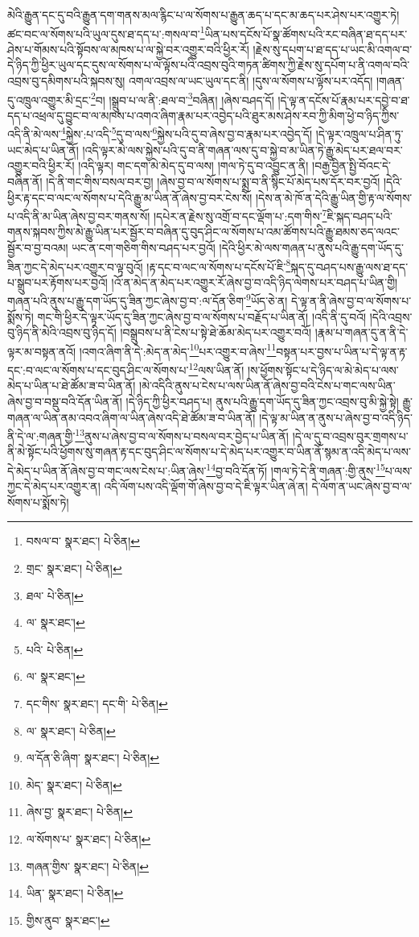 མེའི་རྒྱུན་དང་དུ་བའི་རྒྱུན་དག་གནས་མལ་རྙིང་པ་ལ་སོགས་པ་རྒྱུན་ཆད་པ་དང་མ་ཆད་པར་ཤེས་པར་འགྱུར་ཏེ། ཚང་བང་ལ་སོགས་པའི་ཡུལ་དུས་ཐ་དད་པ་:གསལ་བ་\footnote{བསལ་བ་  སྣར་ཐང་།  པེ་ཅིན། }ཡིན་པས་དངོས་པོ་སྣ་ཚོགས་པའི་རང་བཞིན་ཐ་དད་པར་ཤེས་པ་གོམས་པའི་སྟོབས་ལ་མཁས་པ་ལ་སྐྱེ་བར་འགྱུར་བའི་ཕྱིར་རོ། །རྗེས་སུ་དཔག་པ་ཐ་དད་པ་ཡང་མི་འགལ་བ་དེ་ཉིད་ཀྱི་ཕྱིར་ཡུལ་དང་དུས་ལ་སོགས་པ་ལ་ལྟོས་པའི་འབྲས་བུའི་གཏན་ཚིགས་ཀྱི་རྗེས་སུ་དཔོག་པ་ནི་འགལ་བའི་འབྲས་བུ་དམིགས་པའི་སྐབས་སུ། འགལ་འབྲས་ལ་ཡང་ཡུལ་དང་ནི། །དུས་ལ་སོགས་པ་ལྟོས་པར་འདོད། །གཞན་དུ་འཁྲུལ་འགྱུར་མི་དྲང་\footnote{གྲང་  སྣར་ཐང་།  པེ་ཅིན། }བ། །སྒྲུབ་པ་ལ་ནི་:ཐལ་བ་\footnote{ཐལ་  པེ་ཅིན། }བཞིན། །ཞེས་བཤད་དོ། །དེ་ལྟ་ན་དངོས་པོ་རྣམ་པར་དབྱེ་བ་ཐ་དད་པ་འཕྲལ་དུ་བྱུང་བ་ལ་མཁས་པ་འགའ་ཞིག་རྣམ་པར་འབྱེད་པའི་ཐུར་མས་ཤེས་རབ་ཀྱི་མིག་ཕྱེ་བ་ཉིད་ཀྱིས་འདི་ནི་མེ་ལས་\footnote{ལ་  སྣར་ཐང་། }སྐྱེས་:པ་འདི་\footnote{པའི་  པེ་ཅིན། }དུ་བ་ལས་\footnote{ལ་  སྣར་ཐང་། }སྐྱེས་པའི་དུ་བ་ཞེས་བྱ་བ་རྣམ་པར་འབྱེད་དོ། །དེ་ལྟར་འཁྲུལ་པ་ཤིན་ཏུ་ཡང་མེད་པ་ཡིན་ནོ། །འདི་ལྟར་མེ་ལས་སྐྱེས་པའི་དུ་བ་ནི་གཞན་ལས་དུ་བ་སྐྱེ་བ་མ་ཡིན་ཏེ་རྒྱུ་མེད་པར་ཐལ་བར་འགྱུར་བའི་ཕྱིར་རོ། །འདི་ལྟར། གང་དག་མེ་མེད་དུ་བ་ལས། །གལ་ཏེ་དུ་བ་འབྱུང་ན་ནི། །བརྒྱ་བྱིན་སྤྱི་བོའང་དེ་བཞིན་ནོ། །དེ་ནི་གང་གིས་བསལ་བར་བྱ། །ཞེས་བྱ་བ་ལ་སོགས་པ་སྨྲ་བ་ནི་སྙིང་པོ་མེད་པས་དོར་བར་བྱའོ། །དེའི་ཕྱིར་རྟ་དང་བ་ལང་ལ་སོགས་པ་དེའི་རྒྱུ་མ་ཡིན་ནོ་ཞེས་བྱ་བར་ངེས་སོ། །དེས་ན་མེ་ཁོ་ན་དེའི་རྒྱུ་ཡིན་གྱི་རྟ་ལ་སོགས་པ་འདི་ནི་མ་ཡིན་ཞེས་བྱ་བར་གནས་སོ། །དཔེར་ན་རྗེས་སུ་འགྲོ་བ་དང་ལྡོག་པ་:དག་གིས་\footnote{དང་གིས་  སྣར་ཐང་། དང་གི་  པེ་ཅིན། }ཇི་སྐད་བཤད་པའི་གནས་སྐབས་ཀྱིས་མེ་རྒྱུ་ཡིན་པར་སྦྱོར་བ་བཞིན་དུ་བུད་ཤིང་ལ་སོགས་པ་འམ་ཚོགས་པའི་རྒྱུ་ཐམས་ཅད་ལའང་སྦྱོར་བ་བྱ་བའམ། ཡང་ན་ངག་གཅིག་གིས་བཤད་པར་བྱའོ། །དེའི་ཕྱིར་མེ་ལས་གཞན་པ་ནུས་པའི་རྒྱུ་དག་ཡོད་དུ་ཟིན་ཀྱང་དེ་མེད་པར་འགྱུར་བ་ལྟ་བུའོ། །རྟ་དང་བ་ལང་ལ་སོགས་པ་དངོས་པོ་ཇི་\footnote{ལ་  སྣར་ཐང་།  པེ་ཅིན། }སྐད་དུ་བཤད་པས་རྒྱུ་ལས་ཐ་དད་པ་སྒྲུབ་པར་རྟོགས་པར་བྱའོ། །འོ་ན་མེད་ན་མེད་པར་འགྱུར་རོ་ཞེས་བྱ་བ་འདི་ཉིད་ལེགས་པར་བཤད་པ་ཡིན་གྱི། གཞན་པའི་ནུས་པ་རྒྱུ་དག་ཡོད་དུ་ཟིན་ཀྱང་ཞེས་བྱ་བ་:ལ་དོན་ཅིག་\footnote{ལ་དོན་ཅི་ཞིག་  སྣར་ཐང་།  པེ་ཅིན། }ཡོད་ཅེ་ན། དེ་ལྟ་ན་ནི་ཞེས་བྱ་བ་ལ་སོགས་པ་སྨོས་ཏེ། གང་གི་ཕྱིར་དེ་ལྟར་ཡོད་དུ་ཟིན་ཀྱང་ཞེས་བྱ་བ་ལ་སོགས་པ་བརྗོད་པ་ཡིན་ནོ། །འདི་ནི་དུ་བའོ། །དེའི་འབྲས་བུ་ཉིད་ནི་མེའི་འབྲས་བུ་ཉིད་དོ། །བསྒྲུབས་པ་ནི་ངེས་པ་སྟེ་ཐེ་ཆོམ་མེད་པར་འགྱུར་བའོ། །རྣམ་པ་གཞན་དུ་ན་ནི་དེ་ལྟར་མ་བསྟན་ནའོ། །འགའ་ཞིག་ནི་དེ་:མེད་ན་མེད་\footnote{མེད་  སྣར་ཐང་།  པེ་ཅིན། }པར་འགྱུར་བ་ཞེས་\footnote{ཞེས་བྱ་  སྣར་ཐང་།  པེ་ཅིན། }བསྟན་པར་བྱས་པ་ཡིན་པ་དེ་ལྟ་ན་རྟ་དང་:བ་ལང་ལ་སོགས་པ་དང་བུད་ཤིང་ལ་སོགས་པ་\footnote{ལ་སོགས་པ་  སྣར་ཐང་།  པེ་ཅིན། }ལས་ཡིན་ནོ། །ས་ཕྱོགས་སྟོང་པ་དེ་ཉིད་ལ་མེ་མེད་པ་ལས་མེད་པ་ཡིན་པ་ཐེ་ཚོམ་ཟ་བ་ཡིན་ནོ། །མེ་འདིའི་ནུས་པ་ངེས་པ་ལས་ཡིན་ནོ་ཞེས་བྱ་བའི་ངེས་པ་གང་ལས་ཡིན་ཞེས་བྱ་བ་བསྡུ་བའི་དོན་ཡིན་ནོ། །དེ་ཉིད་ཀྱི་ཕྱིར་བཤད་པ། ནུས་པའི་རྒྱུ་དག་ཡོད་དུ་ཟིན་ཀྱང་འབྲས་བུ་མི་སྐྱེ་སྟེ། རྒྱུ་གཞན་ལ་ཡིན་ནམ་འབའ་ཞིག་ལ་ཡིན་ཞེས་འདི་ཐེ་ཚོམ་ཟ་བ་ཡིན་ནོ། །དེ་ལྟ་མ་ཡིན་ན་ནུས་པ་ཞེས་བྱ་བ་འདི་ཉིད་ནི་དེ་ལ་:གཞན་གྱི་\footnote{གཞན་གྱིས་  སྣར་ཐང་།  པེ་ཅིན། }ནུས་པ་ཞེས་བྱ་བ་ལ་སོགས་པ་བསལ་བར་བྱེད་པ་ཡིན་ནོ། །དེ་ལ་དུ་བ་འབྲས་བུར་གྲགས་པ་ནི་མེ་སྟོང་པའི་ཕྱོགས་སུ་གཞན་རྟ་དང་བུད་ཤིང་ལ་སོགས་པ་དེ་མེད་པར་འགྱུར་བ་ཡིན་ནོ་སྙམ་ན་འདི་མེད་པ་ལས་དེ་མེད་པ་ཡིན་ནོ་ཞེས་བྱ་བ་གང་ལས་ངེས་པ་:ཡིན་ཞེས་\footnote{ཡིན་  སྣར་ཐང་།  པེ་ཅིན། }བྱ་བའི་དོན་ཏོ། །གལ་ཏེ་དེ་ནི་གཞན་:གྱི་ནུས་\footnote{གྱིས་ནུབ་  སྣར་ཐང་། }པ་ལས་ཀྱང་དེ་མེད་པར་འགྱུར་ན། འདི་ལོག་པས་འདི་ལྡོག་གོ་ཞེས་བྱ་བ་དེ་ཇི་ལྟར་ཡིན་ཞེ་ན། དེ་ལོག་ན་ཡང་ཞེས་བྱ་བ་ལ་སོགས་པ་སྨོས་ཏེ། 